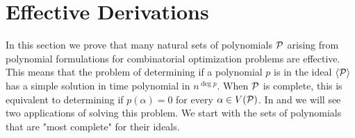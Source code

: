 \chapter{Effective Derivations}\label{cha:effective_derivations}
In this section we prove that many natural sets of polynomials $\mathcal P$ arising from polynomial formulations for combinatorial optimization problems are effective. This means that the problem of determining if a polynomial $p$ is in the ideal $\langle \mathcal P \rangle$ has a simple solution in time polynomial in $n^{\deg p}$. When $\mathcal P$ is complete, this is equivalent to determining if $p(\alpha) = 0$ for every $\alpha \in V(\mathcal P)$. In  and  we will see two applications of solving this problem. We start with the sets of polynomials that are "most complete" for their ideals.


